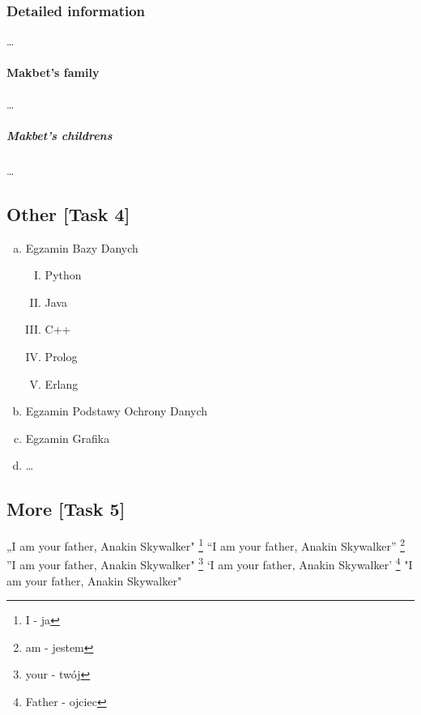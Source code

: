 \documentclass[12pt, letterpaper, twoside]{article}
\begin{document}
\subsubsection{Detailed information}
\ldots
\paragraph{Makbet's family}
\ldots
\subparagraph{Makbet's childrens}
\ldots

\newpage
\subsection{Other [Task 4]}
\begin{enumerate}[a)]
    \item Egzamin Bazy Danych
\begin{enumerate}[I.]
    \item Python
    \item Java
    \item C++
    \item Prolog
    \item Erlang
    
\end{enumerate}

    \item Egzamin Podstawy Ochrony Danych
    \item Egzamin Grafika
    \item \ldots

\end{enumerate}

\subsection{More [Task 5]}
„I am your father, Anakin Skywalker"
\footnote{I - ja}
\newline
``I am your father, Anakin Skywalker''
\footnote{am - jestem}
\newline
''I am your father, Anakin Skywalker"
\footnote{your - twój}
\newline
`I am your father, Anakin Skywalker'
\footnote{Father - ojciec}
\newline
"I am your father, Anakin Skywalker"
\end{document}
